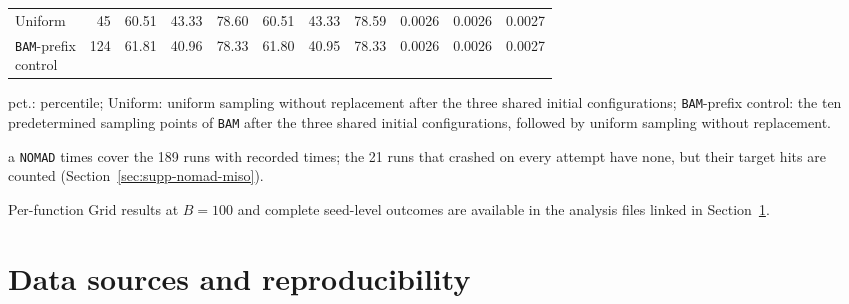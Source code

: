 \begin{table}[htbp]
\begin{threeparttable}
\begin{tabular}{@{}lrrrrrrrrrr@{}}
Uniform & 45 & 60.51 & 43.33 & 78.60 & 60.51 & 43.33 & 78.59 & 0.0026 & 0.0026 & 0.0027 \\
\makecell[l]{\texttt{BAM}-prefix\\control} & 124 & 61.81 & 40.96 & 78.33 & 61.80 & 40.95 & 78.33 & 0.0026 & 0.0026 & 0.0027 \\
\bottomrule
\end{tabular}
\begin{tablenotes}[flushleft]\footnotesize
\item pct.: percentile; Uniform: uniform sampling without replacement after the three shared initial configurations; \texttt{BAM}-prefix control: the ten predetermined sampling points of \texttt{BAM} after the three shared initial configurations, followed by uniform sampling without replacement.
\item[a] \texttt{NOMAD} times cover the 189 runs with recorded times; the 21 runs that crashed on every attempt have none, but their target hits are counted (Section~\ref{sec:supp-nomad-miso}).
\end{tablenotes}
\end{threeparttable}
\end{table}

Per-function Grid results at \(B=100\) and complete seed-level outcomes are available in the analysis files linked in Section~\ref{sec:supp-data}.

\FloatBarrier
\begingroup
\section{Data sources and reproducibility}\label{sec:supp-data}

